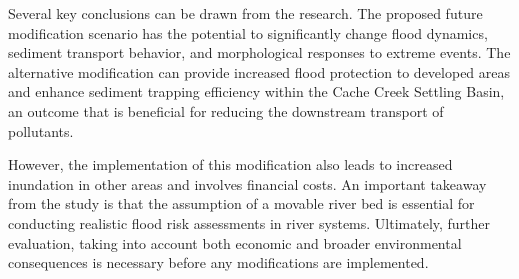 \documentclass[a4paper, 11pt]{article}
\begin{document}
Several key conclusions can be drawn from the research. The proposed future modification scenario has the potential to significantly change flood dynamics, sediment transport behavior, and morphological responses to extreme events. The alternative modification can provide increased flood protection to developed areas and enhance sediment trapping efficiency within the Cache Creek Settling Basin, an outcome that is beneficial for reducing the downstream transport of pollutants.

However, the implementation of this modification also leads to increased inundation in other areas and involves financial costs. An important takeaway from the study is that the assumption of a movable river bed is essential for conducting realistic flood risk assessments in river systems. Ultimately, further evaluation, taking into account both economic and broader environmental consequences is necessary before any modifications are implemented.
\end{document}
